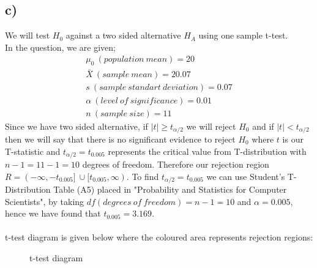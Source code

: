 \documentclass[12pt]{article}
\begin{document}
\subsection*{c)} We will test $H_{0}$ against a two sided alternative $H_{A}$ using one sample t-test. \\
In the question, we are given;
\begin{equation} 
\begin{split}
\mu_{0} \ (population \ mean)= 20 \\
\bar{X} \ (sample \ mean) = 20.07 \\
s \ (sample \ standart \ deviation) = 0.07 \\
\alpha \ (level \ of \ significance) = 0.01 \\
n \ (sample \ size) = 11
\end{split}
\end{equation}
Since we have two sided alternative, if $|t| \geq t_{\alpha/2}$ we will reject $H_{0}$ and if $|t| < t_{\alpha/2}$ then we will say that there is no significant evidence to reject $H_{0}$ where $t$ is our T-statistic and $t_{\alpha/2} = t_{0.005}$ represents the critical value from T-distribution with $n-1 = 11 -1 = 10$ degrees of freedom. Therefore our rejection region $R = (-\infty,-t_{0.005}] \ \cup [t_{0.005},\infty)$. To find $t_{\alpha/2} = t_{0.005}$ we can use Student’s T-Distribution Table (A5) placed in "Probability and Statistics for Computer Scientists", by taking $df (degrees \ of \ freedom) = n-1 = 10$ and $\alpha = 0.005$, hence we have found that $t_{0.005} = 3.169$. \\ \\
t-test diagram is given below where the coloured area represents rejection regions: 

\begin{figure}[H]
\centering
{}
\caption{t-test diagram}
\end{figure}
\end{document}
